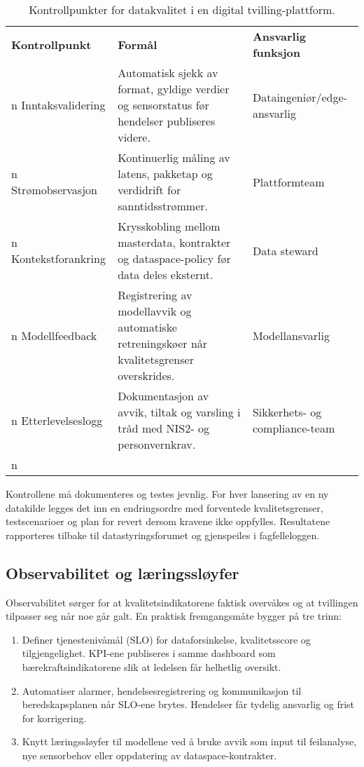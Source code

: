 \begin{table}[ht]
    \centering
    \caption{Kontrollpunkter for datakvalitet i en digital tvilling-plattform.}
    \label{tab:kap03-datakvalitet}
    \begin{tabular}{p{}p{}p{}}
        \toprule
        \textbf{Kontrollpunkt} & \textbf{Formål} & \textbf{Ansvarlig funksjon} \\n        \midrule
        Inntaksvalidering & Automatisk sjekk av format, gyldige verdier og sensorstatus før hendelser publiseres videre. & Dataingeniør/edge-ansvarlig \\n        Strømobservasjon & Kontinuerlig måling av latens, pakketap og verdidrift for sanntidsstrømmer. & Plattformteam \\n        Kontekstforankring & Krysskobling mellom masterdata, kontrakter og dataspace-policy før data deles eksternt. & Data steward \\n        Modellfeedback & Registrering av modellavvik og automatiske retreningskøer når kvalitetsgrenser overskrides. & Modellansvarlig \\n        Etterlevelseslogg & Dokumentasjon av avvik, tiltak og varsling i tråd med NIS2- og personvernkrav. & Sikkerhets- og compliance-team \\n        \bottomrule
    \end{tabular}
\end{table}

Kontrollene må dokumenteres og testes jevnlig. For hver lansering av en ny datakilde legges det inn en endringsordre med forventede kvalitetsgrenser, testscenarioer og plan for revert dersom kravene ikke oppfylles. Resultatene rapporteres tilbake til datastyringsforumet og gjenspeiles i fagfelleloggen.

\subsection{Observabilitet og læringssløyfer}
Observabilitet sørger for at kvalitetsindikatorene faktisk overvåkes og at tvillingen tilpasser seg når noe går galt. En praktisk fremgangsmåte bygger på tre trinn:
\begin{enumerate}
    \item Definer tjenestenivåmål (SLO) for dataforsinkelse, kvalitetsscore og tilgjengelighet. KPI-ene publiseres i samme dashboard som bærekraftsindikatorene slik at ledelsen får helhetlig oversikt.
    \item Automatiser alarmer, hendelsesregistrering og kommunikasjon til beredskapsplanen når SLO-ene brytes. Hendelser får tydelig ansvarlig og frist for korrigering.
    \item Knytt læringssløyfer til modellene ved å bruke avvik som input til feilanalyse, nye sensorbehov eller oppdatering av dataspace-kontrakter.
\end{enumerate}

